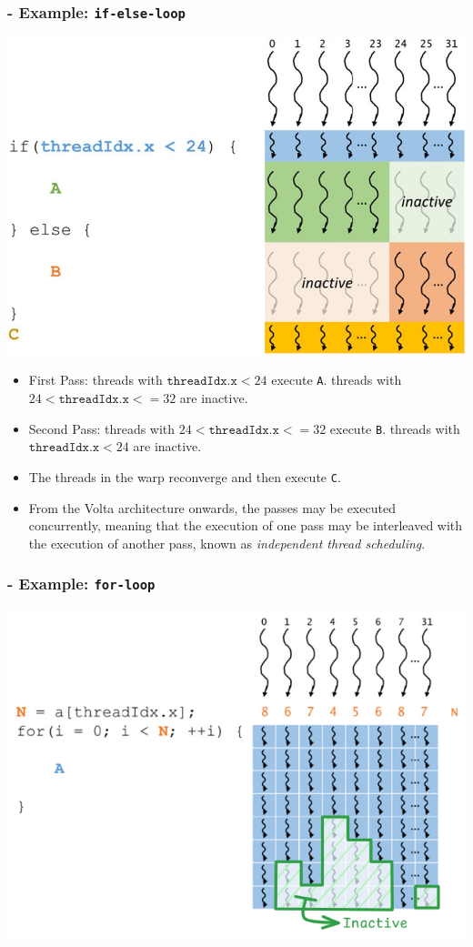 \subsubsection{- Example: \texttt{if-else-loop}}
\begin{center}
    \includegraphics[width=0.6\linewidth]{Images/CompArch/control_divergence_ifelse.png}
\end{center}
\begin{itemize}

    \item First Pass:
          \subitem threads with $\texttt{threadIdx.x} < 24$ execute \texttt{A}.
          \subitem threads with  $24 < \texttt{threadIdx.x} <= 32$ are inactive.
    \item Second Pass:
          \subitem threads with  $24 < \texttt{threadIdx.x} <= 32$ execute \texttt{B}.
          \subitem threads with $\texttt{threadIdx.x} < 24$ are inactive.
    \item The threads in the warp reconverge and then execute \texttt{C}.
    \item From the Volta architecture onwards, the passes may be executed concurrently, meaning that the execution of one pass may be interleaved with the execution of another pass, known as \textit{independent thread scheduling}.
\end{itemize}

\subsubsection{- Example: \texttt{for-loop}}
\begin{center}
    \includegraphics[width=0.5\linewidth]{Images/CompArch/control_divergence_for.png}
\end{center}

